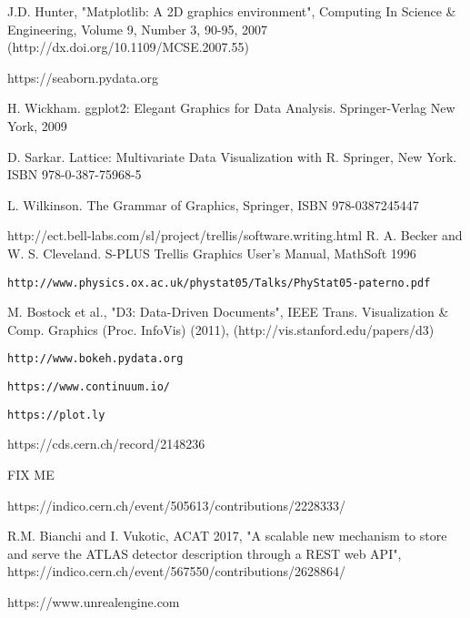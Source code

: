 \documentclass[12pt,a4paper]{article}
\begin{document}
\begin{thebibliography}{999}
 J.D. Hunter, "Matplotlib: A 2D graphics environment", Computing In Science \& Engineering, Volume 9, Number 3, 90-95, 2007 (http://dx.doi.org/10.1109/MCSE.2007.55)

 https://seaborn.pydata.org

 H. Wickham. ggplot2: Elegant Graphics for Data Analysis. Springer-Verlag New York, 2009

 D. Sarkar. Lattice: Multivariate Data Visualization with R. Springer, New York. ISBN 978-0-387-75968-5

 L. Wilkinson. The Grammar of Graphics, Springer, ISBN 978-0387245447

 http://ect.bell-labs.com/sl/project/trellis/software.writing.html
 R. A. Becker and W. S. Cleveland. S-PLUS Trellis Graphics User's Manual, MathSoft 1996

 {\tt http://www.physics.ox.ac.uk/phystat05/Talks/PhyStat05-paterno.pdf}

 M. Bostock et al., "D3: Data-Driven Documents", IEEE Trans. Visualization \& Comp. Graphics (Proc. InfoVis) (2011), (http://vis.stanford.edu/papers/d3)

 {\tt http://www.bokeh.pydata.org}

 {\tt https://www.continuum.io/}

 {\tt https://plot.ly}


 https://cds.cern.ch/record/2148236

 FIX ME %

 https://indico.cern.ch/event/505613/contributions/2228333/


 R.M. Bianchi and I. Vukotic, ACAT 2017, "A scalable new mechanism to store and serve the ATLAS detector description through a REST web API", https://indico.cern.ch/event/567550/contributions/2628864/













 https://www.unrealengine.com



\end{thebibliography}
\end{document}
